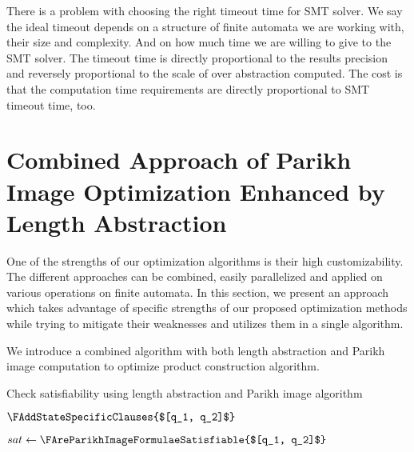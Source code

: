 There is a problem with choosing the right timeout time for SMT solver. We say the ideal timeout depends on a structure of finite automata we are working with, their size and complexity. And on how much time we are willing to give to the SMT solver. The timeout time is directly proportional to the results precision and reversely proportional to the scale of over abstraction computed. The cost is that the computation time requirements are directly proportional to SMT timeout time, too.


\section{Combined Approach of Parikh Image Optimization Enhanced by Length Abstraction}

One of the strengths of our optimization algorithms is their high customizability. The different approaches can be combined, easily parallelized and applied on various operations on finite automata. In this section, we present an approach which takes advantage of specific strengths of our proposed optimization methods while trying to mitigate their weaknesses and utilizes them in a single algorithm.

We introduce a combined algorithm with both length abstraction and Parikh image computation to optimize product construction algorithm. %

\begin{algorithm}
\caption{Check satisfiability using length abstraction and Parikh image algorithm}\label{checkSatisfiabilityAlgorithm}
\DontPrintSemicolon
{}
\BlankLine


$ \FAddStateSpecificClauses{$[q_1, q_2]$} $\;

$sat \gets \FAreParikhImageFormulaeSatisfiable{$[q_1, q_2]$} $ \;

\end{algorithm}\DecMargin{1em}


